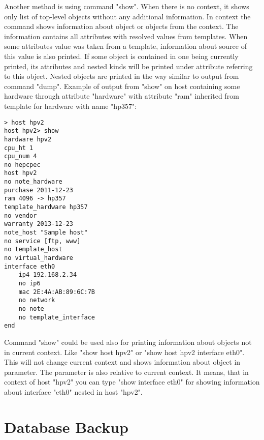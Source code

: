 \documentclass[deska]{subfiles}
\begin{document}
Another method is using command "show". When there is no context, it shows only list of top-level objects without any
additional information. In context the command shows information about object or objects from the context. The
information contains all attributes with resolved values from templates. When some attributes value was taken from
a template, information about source of this value is also printed. If some object is contained in one being currently
printed, its attributes and nested kinds will be printed under attribute referring to this object. Nested objects are
printed in the way similar to output from command "dump". Example of output from "show" on host containing some hardware
through attribute "hardware" with attribute "ram" inherited from template for hardware with name "hp357":

\begin{verbatim}
> host hpv2
host hpv2> show
hardware hpv2
cpu_ht 1
cpu_num 4
no hepcpec
host hpv2
no note_hardware
purchase 2011-12-23
ram 4096 -> hp357
template_hardware hp357
no vendor
warranty 2013-12-23
note_host "Sample host"
no service [ftp, www]
no template_host
no virtual_hardware
interface eth0
    ip4 192.168.2.34
    no ip6
    mac 2E:4A:AB:89:6C:7B
    no network
    no note
    no template_interface
end
\end{verbatim}

Command "show" could be used also for printing information about objects not in current context. Like "show host hpv2" or
"show host hpv2 interface eth0". This will not change current context and shows information about object in parameter.
The parameter is also relative to current context. It means, that in context of host "hpv2" you can type "show interface eth0"
for showing information about interface "eth0" nested in host "hpv2".

\section{Database Backup}
\label{sec:cli-db-backup}

\end{document}
